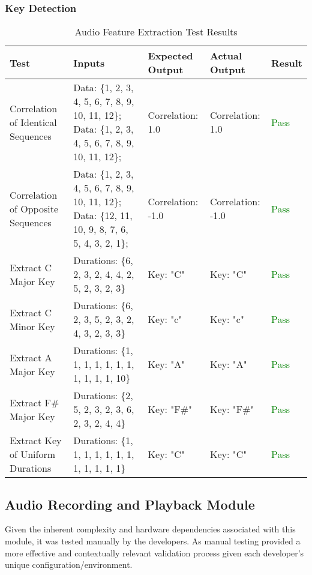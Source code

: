 \documentclass[12pt, titlepage]{article}
\begin{document}
\subsubsection{Key Detection}
\begin{longtable}{|L{3cm}|L{3cm}|L{2.5cm}|L{2.5cm}|l|}
  \caption{Audio Feature Extraction Test Results} \\
  \hline
  \textbf{Test} & \textbf{Inputs} & \textbf{Expected Output} & \textbf{Actual Output} & \textbf{Result} \\
  \hline
  Correlation of Identical Sequences &
    Data: \{1, 2, 3, 4, 5, 6, 7, 8, 9, 10, 11, 12\}; \newline
    Data: \{1, 2, 3, 4, 5, 6, 7, 8, 9, 10, 11, 12\}; &
    Correlation: 1.0 &
    Correlation: 1.0 &
    \textcolor{green}{Pass} \\
  \hline
  Correlation of Opposite Sequences &
    Data: \{1, 2, 3, 4, 5, 6, 7, 8, 9, 10, 11, 12\}; \newline
    Data: \{12, 11, 10, 9, 8, 7, 6, 5, 4, 3, 2, 1\}; &
    Correlation: -1.0 &
    Correlation: -1.0 &
    \textcolor{green}{Pass} \\
  \hline
  Extract C Major Key &
    Durations: \{6, 2, 3, 2, 4, 4, 2, 5, 2, 3, 2, 3\} &
    Key: "C" &
    Key: "C" &
    \textcolor{green}{Pass} \\
  \hline
  Extract C Minor Key &
    Durations: \{6, 2, 3, 5, 2, 3, 2, 4, 3, 2, 3, 3\} &
    Key: "c" &
    Key: "c" &
    \textcolor{green}{Pass} \\
  \hline
  Extract A Major Key &
    Durations: \{1, 1, 1, 1, 1, 1, 1, 1, 1, 1, 1, 10\} &
    Key: "A" &
    Key: "A" &
    \textcolor{green}{Pass} \\
  \hline
  Extract F\# Major Key &
    Durations: \{2, 5, 2, 3, 2, 3, 6, 2, 3, 2, 4, 4\} &
    Key: "F\#" &
    Key: "F\#" &
    \textcolor{green}{Pass} \\
  \hline
  Extract Key of Uniform Durations &
    Durations: \{1, 1, 1, 1, 1, 1, 1, 1, 1, 1, 1, 1\} &
    Key: "C" &
    Key: "C" &
    \textcolor{green}{Pass} \\
  \hline
\end{longtable}

\subsection{Audio Recording and Playback Module}
Given the inherent complexity and hardware dependencies associated with this module, it 
was tested manually by the developers. As manual testing provided a more effective and contextually 
relevant validation process given each developer's unique configuration/environment.
\end{document}
